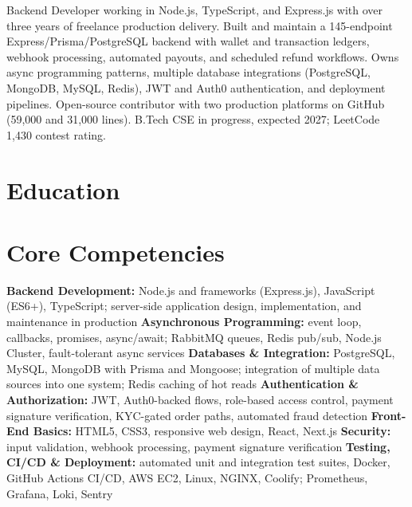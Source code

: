 \documentclass[11pt,a4paper,sans]{moderncv}
\begin{document}
\makecvtitle


\vspace{4pt}
\small{Backend Developer working in Node.js, TypeScript, and Express.js with over three years of freelance production delivery. Built and maintain a 145-endpoint Express/Prisma/PostgreSQL backend with wallet and transaction ledgers, webhook processing, automated payouts, and scheduled refund workflows. Owns async programming patterns, multiple database integrations (PostgreSQL, MongoDB, MySQL, Redis), JWT and Auth0 authentication, and deployment pipelines. Open-source contributor with two production platforms on GitHub (59,000 and 31,000 lines). B.Tech CSE in progress, expected 2027; LeetCode 1,430 contest rating.}


\section{Education}
\vspace{1pt}


\section{Core Competencies}
\vspace{1pt}
\raggedright
\textbf{Backend Development:} Node.js and frameworks (Express.js), JavaScript (ES6+), TypeScript; server-side application design, implementation, and maintenance in production \textbar{}
\textbf{Asynchronous Programming:} event loop, callbacks, promises, async/await; RabbitMQ queues, Redis pub/sub, Node.js Cluster, fault-tolerant async services \textbar{}
\textbf{Databases \& Integration:} PostgreSQL, MySQL, MongoDB with Prisma and Mongoose; integration of multiple data sources into one system; Redis caching of hot reads \textbar{}
\textbf{Authentication \& Authorization:} JWT, Auth0-backed flows, role-based access control, payment signature verification, KYC-gated order paths, automated fraud detection \textbar{}
\textbf{Front-End Basics:} HTML5, CSS3, responsive web design, React, Next.js \textbar{}
\textbf{Security:} input validation, webhook processing, payment signature verification \textbar{}
\textbf{Testing, CI/CD \& Deployment:} automated unit and integration test suites, Docker, GitHub Actions CI/CD, AWS EC2, Linux, NGINX, Coolify; Prometheus, Grafana, Loki, Sentry
\par\normalfont
\end{document}

